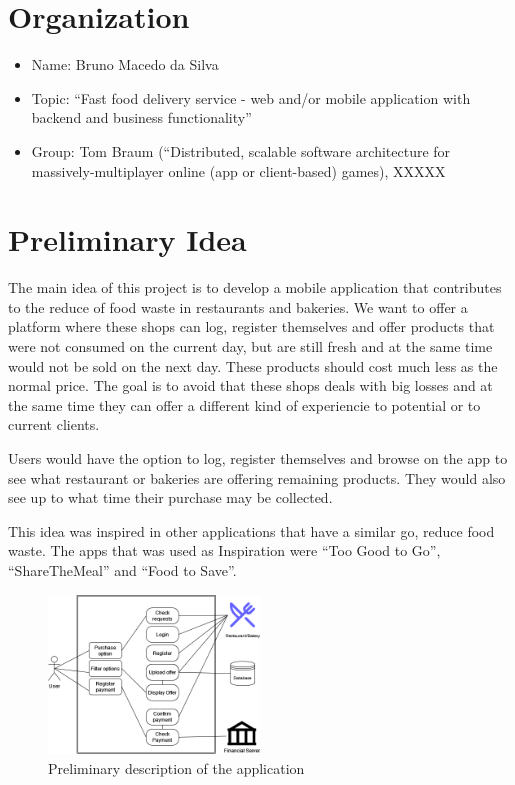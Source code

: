\documentclass[pdftex, a4paper]{scrartcl}
\begin{document}
\section{Organization}

\begin{itemize}
    \item Name: Bruno Macedo da Silva
    \item Topic: “Fast food delivery service - web and/or mobile application with backend and business functionality”
    \item Group: Tom Braum (“Distributed, scalable software architecture for massively-multiplayer online (app or 
    client-based) games), XXXXX
\end{itemize}

\section{Preliminary Idea}

The main idea of this project is to develop a mobile application that contributes to the reduce of food waste 
in restaurants and bakeries. We want to offer a platform where these shops can log, register themselves and offer
products that were not consumed on the current day, but are still fresh and at the same time would not be sold on 
the next day. These products should cost much less as the normal price. The goal is to avoid that these shops deals
with big losses and at the same time they can offer a different kind of experiencie to potential or to current clients.

Users would have the option to log, register themselves and browse on the app to see what restaurant or bakeries
are offering remaining products. They would also see up to what time their purchase may be collected.

This idea was inspired in other applications that have a similar go, reduce food waste. The apps that was used as Inspiration
were ``Too Good to Go'', ``ShareTheMeal'' and ``Food to Save''.

\begin{figure}[htb]
    \centering
    \includegraphics[width=0.50\textwidth]{assets/preliminary_use_case.png}
    \caption{Preliminary description of the application}
    \label{fig:predes}
\end{figure}
\end{document}

